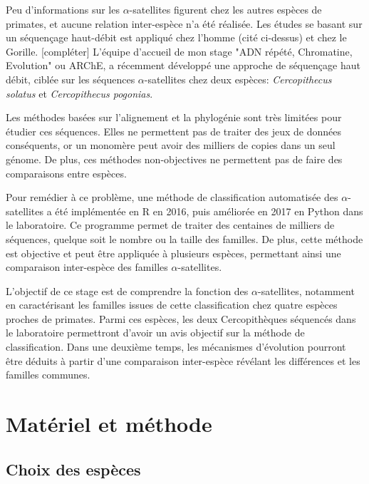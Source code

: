 \documentclass[12pt,a4paper]{article}
\begin{document}
Peu d'informations sur les $\alpha$-satellites figurent chez les autres espèces de primates, et aucune relation inter-espèce n'a été réalisée. Les études se basant sur un séquençage haut-débit est appliqué chez l'homme (cité ci-dessus) et chez le Gorille. [compléter] L'équipe d'accueil de mon stage "ADN répété, Chromatine, Evolution" ou ARChE, a récemment développé une approche de séquençage haut débit, ciblée sur les séquences $\alpha$-satellites chez deux espèces: \textit{Cercopithecus solatus} et \textit{Cercopithecus pogonias}.

Les méthodes basées sur l'alignement et la phylogénie sont très limitées pour étudier ces séquences. Elles ne permettent pas de traiter des jeux de données conséquents, or un monomère peut avoir des milliers de copies dans un seul génome. De plus, ces méthodes non-objectives ne permettent pas de faire des comparaisons entre espèces.

Pour remédier à ce problème, une méthode de classification automatisée des $\alpha$-satellites a été implémentée en R en 2016, puis améliorée en 2017 en Python dans le laboratoire. Ce programme permet de traiter des centaines de milliers de séquences, quelque soit le nombre ou la taille des familles. De plus, cette méthode est objective et peut être appliquée à plusieurs espèces, permettant ainsi une comparaison inter-espèce des familles $\alpha$-satellites. 

L'objectif de ce stage est de comprendre la fonction des $\alpha$-satellites, notamment en caractérisant les familles issues de cette classification chez quatre espèces proches de primates. Parmi ces espèces, les deux Cercopithèques séquencés dans le laboratoire permettront d'avoir un avis objectif sur la méthode de classification.  Dans une deuxième temps, les mécanismes d'évolution pourront être déduits à partir d'une comparaison inter-espèce révélant les différences et les familles communes. 

\section{Matériel et méthode}
\subsection{Choix des espèces}
\end{document}
